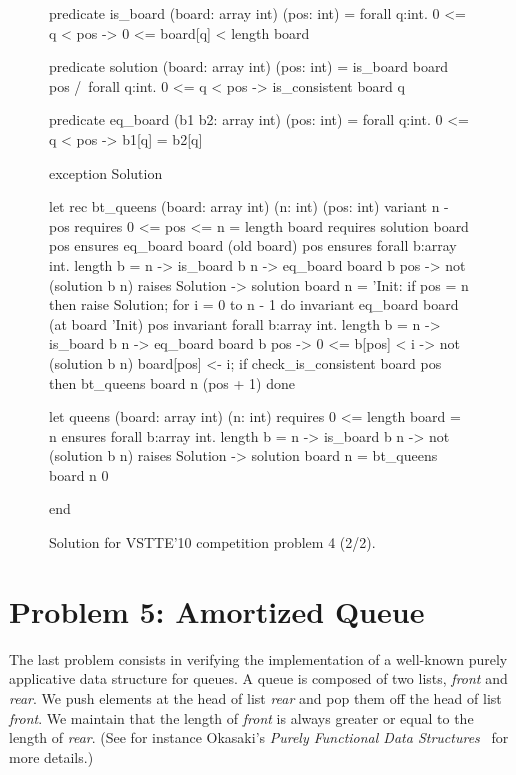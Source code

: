 \begin{figure}
  \centering
\begin{whycode}
  predicate is_board (board: array int) (pos: int) =
    forall q:int. 0 <= q < pos -> 0 <= board[q] < length board

  predicate solution (board: array int) (pos: int) =
    is_board board pos /\
    forall q:int. 0 <= q < pos -> is_consistent board q

  predicate eq_board (b1 b2: array int) (pos: int) =
    forall q:int. 0 <= q < pos -> b1[q] = b2[q]

  exception Solution

  let rec bt_queens (board: array int) (n: int) (pos: int)
    variant  { n - pos }
    requires { 0 <= pos <= n = length board }
    requires { solution board pos }
    ensures  { eq_board board (old board) pos }
    ensures  { forall b:array int. length b = n -> is_board b n ->
                 eq_board board b pos -> not (solution b n) }
    raises   { Solution -> solution board n }
  = 'Init:
    if pos = n then raise Solution;
    for i = 0 to n - 1 do
      invariant { eq_board board (at board 'Init) pos }
      invariant { forall b:array int. length b = n -> is_board b n ->
        eq_board board b pos -> 0 <= b[pos] < i -> not (solution b n) }
      board[pos] <- i;
      if check_is_consistent board pos then bt_queens board n (pos + 1)
    done

  let queens (board: array int) (n: int)
    requires { 0 <= length board = n }
    ensures  { forall b:array int.
                 length b = n -> is_board b n -> not (solution b n) }
    raises   { Solution -> solution board n }
  = bt_queens board n 0

end
\end{whycode}
\vspace*{-1em}%
  \caption{Solution for VSTTE'10 competition problem 4 (2/2).}
  \label{fig:NQueens2}
\end{figure}

\section{Problem 5: Amortized Queue}

The last problem consists in verifying the implementation of a
well-known purely applicative data structure for queues.
A queue is composed of two lists, \textit{front} and \textit{rear}.
We push elements at the head of list \textit{rear} and pop them off
the head of list \textit{front}. We maintain that the length of
\textit{front} is always greater or equal to the length of \textit{rear}.
(See for instance Okasaki's \emph{Purely Functional Data
  Structures}~\cite{okasaki98} for more details.)

